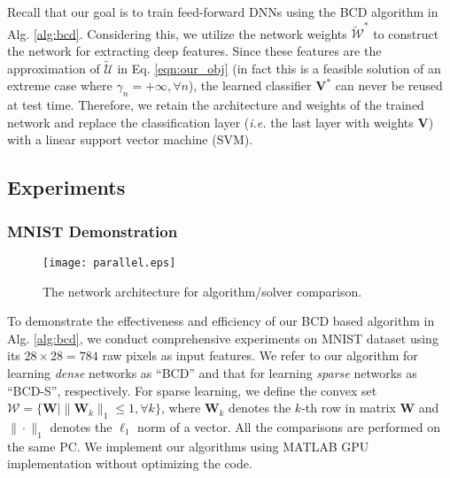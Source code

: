 \documentclass{article}
\def\ie{\emph{i.e. }}
\begin{document}
    
    
Recall that our goal is to train feed-forward DNNs using the BCD algorithm in Alg. \ref{alg:bcd}. Considering this, we utilize the network weights $\tilde{\mathcal{W}}^*$ to construct the network for extracting deep features. Since these features are the approximation of $\tilde{\mathcal{U}}$ in Eq. \ref{eqn:our_obj} (in fact this is a feasible solution of an extreme case where $\gamma_n=+\infty, \forall n$), the learned classifier $\mathbf{V}^*$ can never be reused at test time. Therefore, we %
retain the architecture and weights of the trained network and replace the classification layer (\ie the last layer with weights $\mathbf{V}$) with a linear support vector machine (SVM).

 \subsection{Experiments}
 \subsubsection{MNIST Demonstration}

\begin{wrapfigure}{r}{0.35\linewidth} 
	\vspace{-18pt}
	\begin{center}
		\texttt{[image: parallel.eps]}\vspace{-3mm}
		\caption{\footnotesize The network architecture for algorithm/solver comparison.}
		\label{fig:structure}
	\end{center}
	\vspace{-20pt}
\end{wrapfigure}

To demonstrate the effectiveness and efficiency of our BCD based algorithm in Alg. \ref{alg:bcd}, we conduct comprehensive experiments on MNIST \cite{lecun1998mnist} dataset using its $28\times 28 = 784$ raw pixels as input features. We refer to our algorithm for learning {\em dense} networks as ``BCD'' and that for learning {\em sparse} networks as ``BCD-S'', respectively. For sparse learning, we define the convex set $\mathcal{W}=\{\mathbf{W} \mid \|\mathbf{W}_k\|_1\leq 1, \forall k\}$, where $\mathbf{W}_k$ denotes the $k$-th row in matrix $\mathbf{W}$ and $\|\cdot\|_1$ denotes the $\ell_1$ norm of a vector. All the comparisons are performed on the same PC. We implement our algorithms using MATLAB GPU implementation without optimizing the code.
\end{document}
